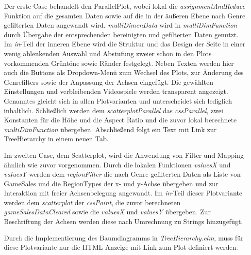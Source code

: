 \documentclass[usegeometry=true]{scrartcl}
\begin{document}
Der erste Case behandelt den ParallelPlot, wobei lokal die \textit{assignmentAndReduce}-Funktion auf die gesamten Daten 
sowie auf die in der äußeren Ebene nach Genre gefilterten Daten angewandt wird.
\textit{multiDimenData} wird in \textit{multiDimFunction} durch Übergabe der entsprechenden bereinigten und gefilterten Daten genutzt. 
Im \textit{in}-Teil der inneren Ebene wird die Struktur und das Design der Seite in einer wenig ablenkenden Auswahl und Abstufung zweier 
schon in den Plots vorkommenden Grüntöne sowie Ränder festgelegt.
Neben Texten werden hier auch die Buttons als Dropdown-Menü zum Wechsel des Plots, 
zur Änderung des Genrefilters sowie der Anpassung der Achsen eingefügt.
Die gewählten Einstellungen und verbleibenden Videospiele werden transparent angezeigt.
Genanntes gleicht sich in allen Plotvarianten und unterscheidet sich lediglich inhaltlich.
Schließlich werden dem \textit{scatterplotParallel} das \textit{cssParallel}, zwei Konstanten für die Höhe und die Aspect Ratio 
und die zuvor lokal berechnete \textit{multiDimFunction} übergeben.
Abschließend folgt ein Text mit Link zur TreeHierarchy in einem neuen Tab.

Im zweiten Case, dem Scatterplot, wird die Anwendung von Filter und Mapping ähnlich wie zuvor vorgenommen.
Durch die lokalen Funktionen \textit{valuesX} und \textit{valuesY} werden dem \textit{regionFilter} die nach Genre gefilterten Daten 
als Liste von GameSales und die RegionTypes der x- und y-Achse übergeben und zur Interaktion mit freier Achsenbelegung angewandt.
Im \textit{in}-Teil dieser Plotvariante werden dem \textit{scatterplot} der \textit{cssPoint}, 
die zuvor berechneten \textit{gameSalesDataCleared} sowie die \textit{valuesX} und \textit{valuesY} übergeben.
Zur Beschriftung der Achsen werden diese nach Umrechnung zu Strings hinzugefügt.

Durch die Implementierung des Baumdiagramms in \textit{TreeHierarchy.elm}, 
muss für diese Plotvariante nur die HTML-Anzeige mit Link zum Plot definiert werden.
\end{document}
